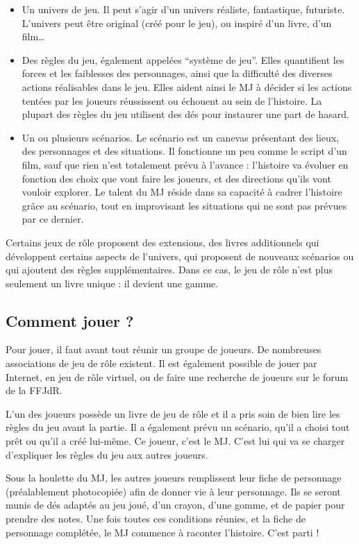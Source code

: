 \begin{itemize}
\item Un univers de jeu. Il peut s’agir d’un univers réaliste, fantastique, futuriste. L’univers peut être original (créé pour le jeu), ou inspiré d’un livre, d’un film…
\item Des règles du jeu, également appelées “système de jeu”. Elles quantifient les forces et les faiblesses des personnages, ainsi que la difficulté des diverses actions réalisables dans le jeu. Elles aident ainsi le MJ à décider si les actions tentées par les joueurs réussissent ou échouent au sein de l’histoire. La plupart des règles du jeu utilisent des dés pour instaurer une part de hasard.
\item Un ou plusieurs scénarios. Le scénario est un canevas présentant des lieux, des personnages et des situations. Il fonctionne un peu comme le script d’un film, sauf que rien n’est totalement prévu à l’avance : l’histoire va évoluer en fonction des choix que vont faire les joueurs, et des directions qu’ils vont vouloir explorer. Le talent du MJ réside dans sa capacité à cadrer l’histoire grâce au scénario, tout en improvisant les situations qui ne sont pas prévues par ce dernier.
\end{itemize}

Certains jeux de rôle proposent des extensions, des livres additionnels qui développent certains aspects de l’univers, qui proposent de nouveaux scénarios ou qui ajoutent des règles supplémentaires. Dans ce cas, le jeu de rôle n’est plus seulement un livre unique : il devient une gamme.

\subsection*{Comment jouer ?}

Pour jouer, il faut avant tout réunir un groupe de joueurs. De nombreuses associations de jeu de rôle existent. Il est également possible de jouer par Internet, en jeu de rôle virtuel, ou de faire une recherche de joueurs sur le forum de la FFJdR.

L’un des joueurs possède un livre de jeu de rôle et il a pris soin de bien lire les règles du jeu avant la partie. Il a également prévu un scénario, qu’il a choisi tout prêt ou qu’il a créé lui-même. Ce joueur, c’est le MJ. C’est lui qui va se charger d’expliquer les règles du jeu aux autres joueurs.

Sous la houlette du MJ, les autres joueurs remplissent leur fiche de personnage (préalablement photocopiée) afin de donner vie à leur personnage. Ils se seront munis de dés adaptés au jeu joué, d’un crayon, d’une gomme, et de papier pour prendre des notes. Une fois toutes ces conditions réunies, et la fiche de personnage complétée, le MJ commence à raconter l’histoire. C’est parti !

